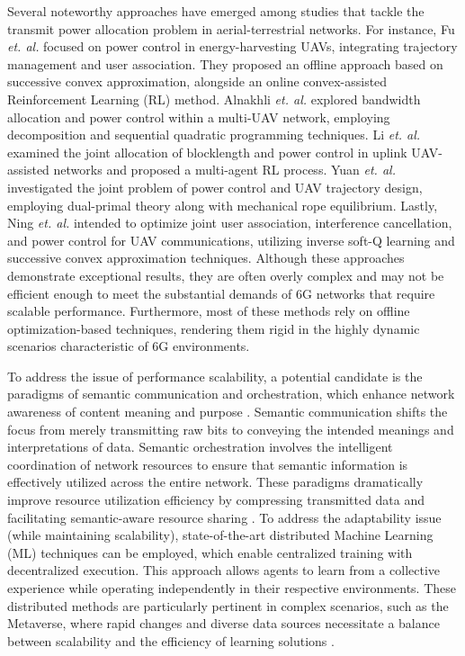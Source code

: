 \documentclass[conference]{IEEEtran}
\begin{document}
Several noteworthy approaches have emerged among studies that tackle the transmit power allocation problem in aerial-terrestrial networks. For instance, Fu \textit{et. al.} \cite{fu2023uav} focused on power control in energy-harvesting UAVs, integrating trajectory management and user association. They proposed an offline approach based on successive convex approximation, alongside an online convex-assisted Reinforcement Learning (RL) method. Alnakhli \textit{et. al.} \cite{10520245} explored bandwidth allocation and power control within a multi-UAV network, employing decomposition and sequential quadratic programming techniques. Li \textit{et. al.} \cite{li2024blocklength} examined the joint allocation of blocklength and power control in uplink UAV-assisted networks and proposed a multi-agent RL process. Yuan \textit{et. al.} \cite{10496864} investigated the joint problem of power control and UAV trajectory design, employing dual-primal theory along with mechanical rope equilibrium. Lastly, Ning \textit{et. al.} \cite{10537097} intended to optimize joint user association, interference cancellation, and power control for UAV communications, utilizing inverse soft-Q learning and successive convex approximation techniques. Although these approaches demonstrate exceptional results, they are often overly complex and may not be efficient enough to meet the substantial demands of 6G networks that require scalable performance. Furthermore, most of these methods rely on offline optimization-based techniques, rendering them rigid in the highly dynamic scenarios characteristic of 6G environments.

To address the issue of performance scalability, a potential candidate is the paradigms of semantic communication and orchestration, which enhance network awareness of content meaning and purpose \cite{shokrnezhad2024semantic}. Semantic communication shifts the focus from merely transmitting raw bits to conveying the intended meanings and interpretations of data. Semantic orchestration involves the intelligent coordination of network resources to ensure that semantic information is effectively utilized across the entire network. These paradigms dramatically improve resource utilization efficiency by compressing transmitted data and facilitating semantic-aware resource sharing \cite{mazandarani2024semantic}. To address the adaptability issue (while maintaining scalability), state-of-the-art distributed Machine Learning (ML) techniques can be employed, which enable centralized training with decentralized execution. This approach allows agents to learn from a collective experience while operating independently in their respective environments. These distributed methods are particularly pertinent in complex scenarios, such as the Metaverse, where rapid changes and diverse data sources necessitate a balance between scalability and the efficiency of learning solutions \cite{taleb2023ai, 10816182}.
\end{document}
